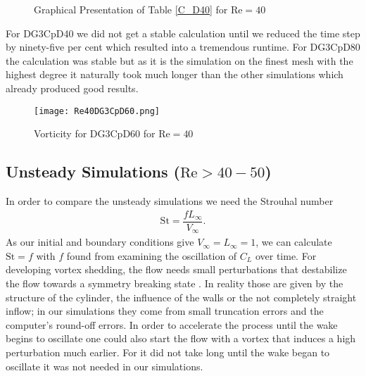 	\begin{figure}[htp]	
		\centering
		\caption{Graphical Presentation of Table \ref{C_D40} for $\text{Re} = 40$}
		\label{shivfjftesrsaror}	
	\end{figure}
For DG3CpD40 we did not get a stable calculation until we reduced the time step by ninety-five per cent which resulted into a tremendous runtime. For DG3CpD80 the calculation was stable but as it is the simulation on the finest mesh with the highest degree it naturally took much longer than the other simulations which already produced good results. \\\indent
\begin{figure}[htp]
	\centering
	\texttt{[image: Re40DG3CpD60.png]}
	\caption{Vorticity for DG3CpD60 for $\text{Re} = 40$}
	\label{fig:vorticity40}
\end{figure}
	\subsection{Unsteady Simulations ($\text{Re}> 40-50$)}
	In order to compare the unsteady simulations we need the Strouhal number
	\begin{align}
		\text{St} = \dfrac{f  L_\infty}{V_\infty}.
	\end{align}
	As our initial and boundary conditions give $V_\infty = L_\infty = 1$, we can calculate $\text{St} = f$ with $f$ found from examining the oscillation of $C_L$ over time. For developing vortex shedding, the flow needs small perturbations that destabilize the flow towards a symmetry breaking state \cite{FLM:14223}. In reality those are given by the structure of the cylinder, the influence of the walls or the not completely straight inflow; in our simulations they come from small truncation errors and the computer's round-off errors. 
	In order to accelerate the process until the wake begins to oscillate one could also start the flow with a vortex that induces a high perturbation much earlier. For it did not take long until the wake began to oscillate it was not needed in our simulations.
